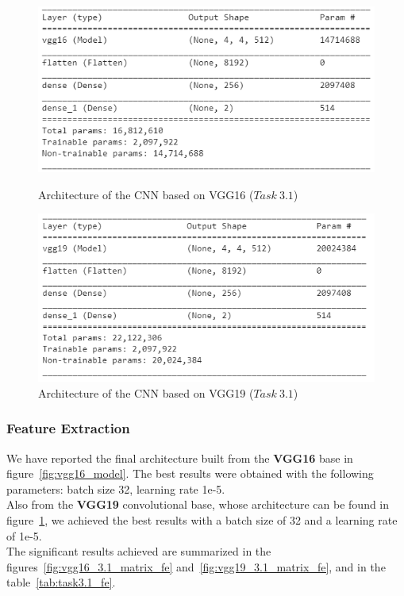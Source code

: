 \documentclass[11pt,a4paper,oneside]{article}
\begin{document}
\begin{figure}[h]
\centering
	\begin{minipage}[c]{.45\textwidth}
		\includegraphics[width=.9\textwidth]{images/Task 3/VGG16 3.1/Model}
		\caption{Architecture of the CNN based on VGG16 ($Task\ 3.1$)}
		\label{fig:vgg16_model}
	\end{minipage}	
	\hspace{5mm}%
	\begin{minipage}[c]{.45\textwidth}
		\centering\setlength{\captionmargin}{0pt}%
		\includegraphics[width=.9\textwidth]{images/Task 3/VGG19 3.1/Model}
		\caption{Architecture of the CNN based on VGG19 ($Task\ 3.1$)}
		\label{fig:vgg19_model}
	\end{minipage}
\end{figure}

\subsubsection{Feature Extraction}
We have reported the final architecture built from the \textbf{VGG16} base in figure~\ref{fig:vgg16_model}. 
The best results were obtained with the following parameters: batch size 32, learning rate 1e-5. \\
Also from the \textbf{VGG19} convolutional base, whose architecture can be found in figure~\ref{fig:vgg19_model}, we achieved the best results with a batch size of 32 and a learning rate of 1e-5. \\
The significant results achieved are summarized in the figures~\ref{fig:vgg16_3.1_matrix_fe} and~\ref{fig:vgg19_3.1_matrix_fe}, and in the table~\ref{tab:task3.1_fe}.
\end{document}
